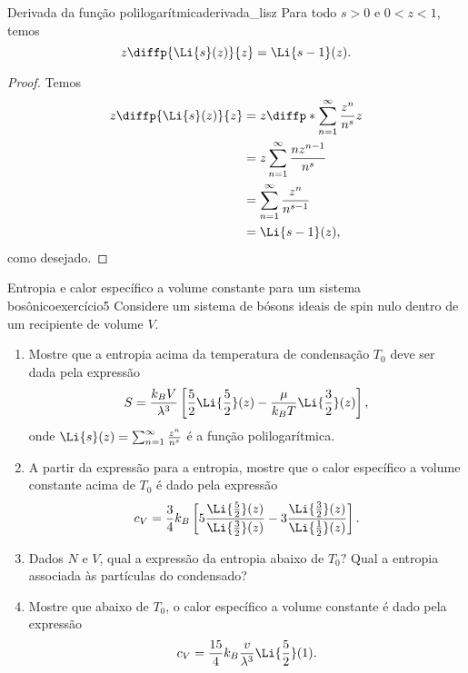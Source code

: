 \begin{lemma}{Derivada da função polilogarítmica}{derivada_lisz}
    Para todo \(s > 0\) e \(0 < z < 1\), temos
    \begin{equation*}
        z\diffp{\Li{s}(z)}{z} = \Li{s-1}(z).
    \end{equation*}
\end{lemma}
\begin{proof}
    Temos
    \begin{align*}
        z\diffp{\Li{s}(z)}{z} &= z \diffp*{\sum_{n = 1}^\infty \frac{z^n}{n^s}}{z}\\
                              &= z\sum_{n = 1}^\infty \frac{nz^{n-1}}{n^{s}}\\
                              &= \sum_{n = 1}^\infty \frac{z^n}{n^{s-1}}\\
                              &= \Li{s - 1}(z),
    \end{align*}
    como desejado.
\end{proof}
\begin{exercício}{Entropia e calor específico a volume constante para um sistema bosônico}{exercício5}
    Considere um sistema de bósons ideais de spin nulo dentro de um recipiente de volume \(V\).
    \begin{enumerate}[label=(\alph*)]
        \item Mostre que a entropia acima da temperatura de condensação \(T_0\) deve ser dada pela expressão
            \begin{equation*}
                S = \frac{k_BV}{\lambda^3}\left[\frac52 \Li{\frac52}(z) - \frac{\mu}{k_B T}\Li{\frac32}(z)\right],
            \end{equation*}
            onde \(\Li{s}(z) = \sum_{n = 1}^\infty \frac{z^n}{n^s}\) é a função polilogarítmica.
        \item A partir da expressão para a entropia, mostre que o calor específico a volume constante acima de \(T_0\) é dado pela expressão
            \begin{equation*}
                c_V = \frac{3}{4} k_B \left[5 \frac{\Li{\frac52}(z)}{\Li{\frac32}(z)} - 3 \frac{\Li{\frac32}(z)}{\Li{\frac12}(z)}\right].
            \end{equation*}
        \item Dados \(N\) e \(V\), qual a expressão da entropia abaixo de \(T_0?\) Qual a entropia associada às partículas do condensado?
        \item Mostre que abaixo de \(T_0\), o calor específico a volume constante é dado pela expressão
            \begin{equation*}
                c_V = \frac{15}{4} k_B \frac{v}{\lambda^3}\Li{\frac52}(1).
            \end{equation*}
    \end{enumerate}
\end{exercício}
